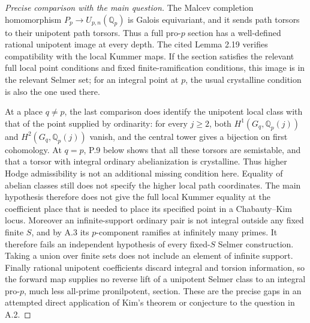 \begin{proof}[Precise comparison with the main question]
The Malcev completion homomorphism
\(P_p\to U_{p,n}(\mathbb Q_p)\) is Galois equivariant, and it sends
path torsors to their unipotent path torsors. Thus a full pro-\(p\)
section has a well-defined rational unipotent image at every depth.
The cited Lemma 2.19 verifies compatibility with the local Kummer maps.
If the section satisfies the relevant full local point conditions and
fixed finite-ramification conditions, this image is in the relevant
Selmer set; for an integral point at \(p\), the usual crystalline
condition is also the one used there.

At a place \(q\ne p\), the last comparison does identify the unipotent
local class with that of the point supplied by ordinarity: for every
\(j\ge2\), both \(H^1(G_q,\mathbb Q_p(j))\) and
\(H^2(G_q,\mathbb Q_p(j))\) vanish, and the central tower gives a
bijection on first cohomology. At \(q=p\), P.9 below shows that all
these torsors are semistable, and that a torsor with integral ordinary
abelianization is crystalline. Thus higher Hodge admissibility is not
an additional missing condition here. Equality of abelian classes still
does not specify the higher local path coordinates. The main hypothesis
therefore does not give the full local Kummer equality at the coefficient
place that is needed to place its specified point in a Chabauty--Kim locus.
Moreover an infinite-support ordinary pair is not integral outside any
fixed finite \(S\), and by A.3 its \(p\)-component ramifies at
infinitely many primes. It therefore fails an independent hypothesis of
every fixed-\(S\) Selmer construction. Taking a union over finite sets
does not include an element of infinite support. Finally rational
unipotent coefficients discard integral and torsion information, so the
forward map supplies no reverse lift of a unipotent Selmer class to an
integral pro-\(p\), much less all-prime pronilpotent, section.
These are the precise gaps in an attempted direct application of Kim's
theorem or conjecture to the question in A.2.
\end{proof}

